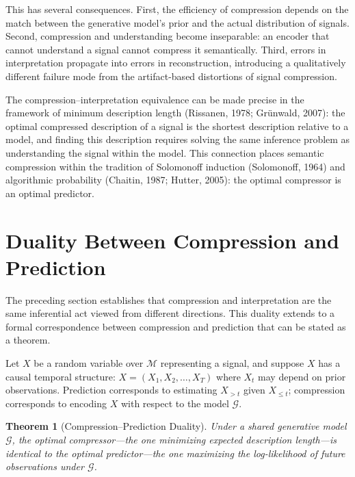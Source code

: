 \documentclass[11pt,a4paper]{article}
\newtheorem{theorem}{Theorem}[section]
\theoremstyle{definition}
\theoremstyle{remark}
\begin{document}
This has several consequences. First, the efficiency of compression depends on the match between the generative model's prior and the actual distribution of signals. Second, compression and understanding become inseparable: an encoder that cannot understand a signal cannot compress it semantically. Third, errors in interpretation propagate into errors in reconstruction, introducing a qualitatively different failure mode from the artifact-based distortions of signal compression.

The compression--interpretation equivalence can be made precise in the framework of minimum description length (Rissanen, 1978; Gr\"{u}nwald, 2007): the optimal compressed description of a signal is the shortest description relative to a model, and finding this description requires solving the same inference problem as understanding the signal within the model. This connection places semantic compression within the tradition of Solomonoff induction (Solomonoff, 1964) and algorithmic probability (Chaitin, 1987; Hutter, 2005): the optimal compressor is an optimal predictor.

\section{Duality Between Compression and Prediction}
\label{sec:duality}

The preceding section establishes that compression and interpretation are the same inferential act viewed from different directions. This duality extends to a formal correspondence between compression and prediction that can be stated as a theorem.

Let $X$ be a random variable over $\mathcal{M}$ representing a signal, and suppose $X$ has a causal temporal structure: $X = (X_1, X_2, \dots, X_T)$ where $X_t$ may depend on prior observations. Prediction corresponds to estimating $X_{>t}$ given $X_{\le t}$; compression corresponds to encoding $X$ with respect to the model $\mathcal{G}$.

\begin{theorem}[Compression--Prediction Duality]
\label{thm:comp_pred}
Under a shared generative model $\mathcal{G}$, the optimal compressor---the one minimizing expected description length---is identical to the optimal predictor---the one maximizing the log-likelihood of future observations under $\mathcal{G}$.
\end{theorem}
\end{document}

